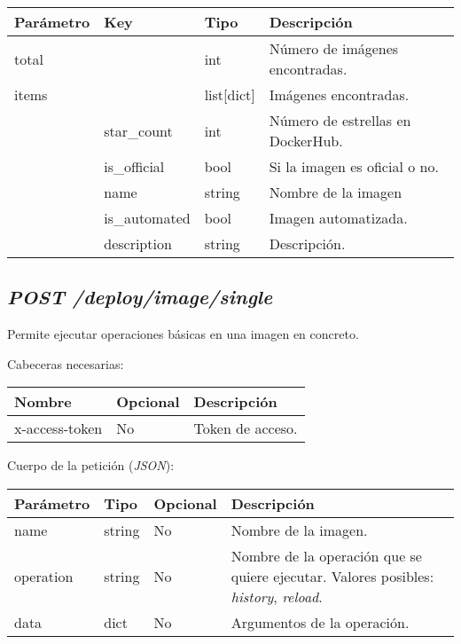 				\begin{table}[h!]
					\centering
	\begin{adjustbox}{max width=\textwidth}
					\begin{tabular}{|l|l|l|l|}
						\hline
						Parámetro & Key & Tipo & Descripción \\ \hline
						total &  & int & Número de imágenes encontradas. \\ \hline
						items &  & list[dict] & Imágenes encontradas. \\ \hline
						& star\_count & int & Número de estrellas en DockerHub. \\ \hline
						& is\_official & bool & Si la imagen es oficial o no. \\ \hline
						& name & string & Nombre de la imagen \\ \hline
						& is\_automated & bool & Imagen automatizada. \\ \hline
						& description & string & Descripción. \\ \hline
					\end{tabular}
\end{adjustbox}
				\end{table}
		
	
	
	\subsection{\textit{POST /deploy/image/single}}
		Permite ejecutar operaciones básicas en una imagen en concreto.
		
		Cabeceras necesarias:
		\begin{table}[h!]
			\centering
	\begin{adjustbox}{max width=\textwidth}
			\begin{tabular}{|l|l|l|}
				\hline
				Nombre & Opcional & Descripción \\ \hline
				x-access-token & No & Token de acceso. \\ \hline
			\end{tabular}
\end{adjustbox}
		\end{table}
		
		Cuerpo de la petición (\textit{JSON}):
		
		\begin{table}[h!]
			\centering
	\begin{adjustbox}{max width=\textwidth}
			\begin{tabularx}{\linewidth}{|l|l|l|L|}
				\hline
				Parámetro & Tipo & Opcional & Descripción \\ \hline
				name & string & No & Nombre de la imagen. \\ \hline
				operation & string & No & Nombre de la operación que se quiere ejecutar. Valores posibles: \textit{history}, \textit{reload}. \\ \hline
				data & dict & No & Argumentos de la operación. \\ \hline
			\end{tabularx}
\end{adjustbox}
		\end{table}
	
